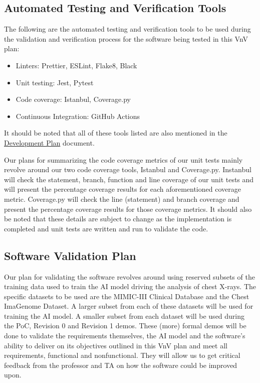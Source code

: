 \documentclass[12pt, titlepage]{article}
\begin{document}
\subsection{Automated Testing and Verification Tools}
The following are the automated testing and verification tools to be used during the validation and verification process for the software being tested in this VnV plan:
\begin{itemize}
    \item Linters: Prettier, ESLint, Flake8, Black
    \item Unit testing: Jest, Pytest
    \item Code coverage: Istanbul, Coverage.py
    \item Continuous Integration: GitHub Actions
\end{itemize}
It should be noted that all of these tools listed are also mentioned in the \href{https://github.com/Tusharagg1/chest-x-ray-ai/blob/main/docs/DevelopmentPlan/DevelopmentPlan.pdf}{Development Plan} document.

Our plans for summarizing the code coverage metrics of our unit tests mainly revolve around our two code coverage tools, Istanbul and Coverage.py. Instanbul will check the statement, branch, function and line coverage of our unit tests and will present the percentage coverage results for each aforementioned coverage metric. Coverage.py will check the line (statement) and branch coverage and present the percentage coverage results for those coverage metrics. It should also be noted that these details are subject to change as the implementation is completed and unit tests are written and run to validate the code.

\subsection{Software Validation Plan}
Our plan for validating the software revolves around using reserved subsets of the training data used to train the AI model driving the analysis of chest X-rays. The specific datasets to be used are the MIMIC-III Clinical Database and the Chest ImaGenome Dataset. A larger subset from each of these datasets will be used for training the AI model. A smaller subset from each dataset will be used during the PoC, Revision 0 and Revision 1 demos. These (more) formal demos will be done to validate the requirements themselves, the AI model and the software's ability to deliver on its objectives outlined in this VnV plan and meet all requirements, functional and nonfunctional. They will allow us to get critical feedback from the professor and TA on how the software could be improved upon.
\end{document}
